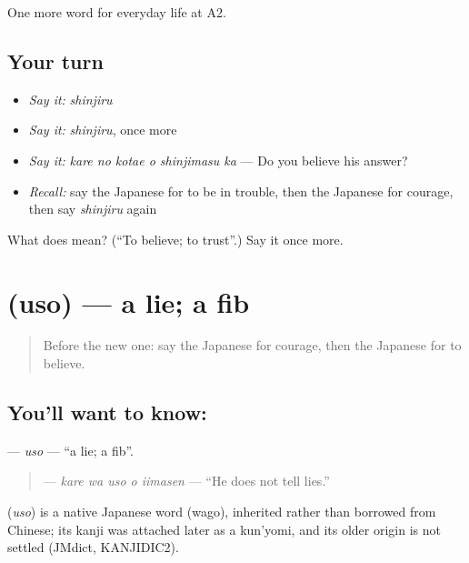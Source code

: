 \begin{grammarlens}[title={What you've built}]
One more word for everyday life at A2.
\end{grammarlens}

\subsection*{Your turn}
\begin{itemize}
\raggedright
  \item \emph{Say it:} \emph{shinjiru}
  \item \emph{Say it:} \emph{shinjiru}, once more
  \item \emph{Say it:} \emph{kare no kotae o shinjimasu ka} — Do you believe his answer?
  \item \emph{Recall:} say the Japanese for to be in trouble, then the Japanese for courage, then say \emph{shinjiru} again
\end{itemize}

\begin{tcolorbox}[breakable,colback=teal!4,colframe=teal!35!black,title={Before you move on}]
What does  mean? (\textquotedblleft{}To believe; to trust\textquotedblright{}.) Say it once more.
\end{tcolorbox}
\section[\texorpdfstring{\ja{うそ} (uso)}{うそ (uso)}]{ (uso) — a lie; a fib}

\label{lesson:JA-C248-uso}



\begin{quote}
Before the new one: say the Japanese for courage, then the Japanese for to believe.
\end{quote}

\subsection*{You'll want to know: }
\textbf{} — \emph{uso} — \textquotedblleft{}a lie; a fib\textquotedblright{}.

\begin{quote}
\textbf{  } — \emph{kare wa uso o iimasen} — \textquotedblleft{}He does not tell lies.\textquotedblright{}
\end{quote}

\begin{cousinweb}
\textbf{} (\emph{uso}) is a native Japanese word (wago), inherited rather than borrowed from Chinese; its kanji was attached later as a kun'yomi, and its older origin is not settled (JMdict, KANJIDIC2).
\end{cousinweb}

